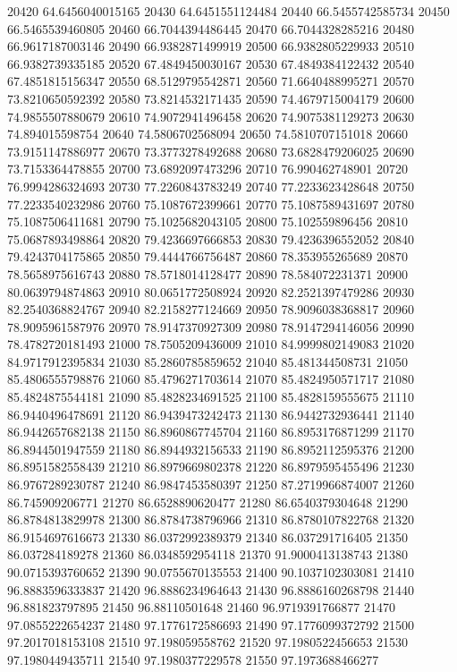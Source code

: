 {20420 64.6456040015165
20430 64.6451551124484
20440 66.5455742585734
20450 66.5465539460805
20460 66.7044394486445
20470 66.7044328285216
20480 66.9617187003146
20490 66.9382871499919
20500 66.9382805229933
20510 66.9382739335185
20520 67.4849450030167
20530 67.4849384122432
20540 67.4851815156347
20550 68.5129795542871
20560 71.6640488995271
20570 73.8210650592392
20580 73.8214532171435
20590 74.4679715004179
20600 74.9855507880679
20610 74.9072941496458
20620 74.9075381129273
20630 74.894015598754
20640 74.5806702568094
20650 74.5810707151018
20660 73.9151147886977
20670 73.3773278492688
20680 73.6828479206025
20690 73.7153364478855
20700 73.6892097473296
20710 76.990462748901
20720 76.9994286324693
20730 77.2260843783249
20740 77.2233623428648
20750 77.2233540232986
20760 75.1087672399661
20770 75.1087589431697
20780 75.1087506411681
20790 75.1025682043105
20800 75.102559896456
20810 75.0687893498864
20820 79.4236697666853
20830 79.4236396552052
20840 79.4243704175865
20850 79.4444766756487
20860 78.353955265689
20870 78.5658975616743
20880 78.5718014128477
20890 78.584072231371
20900 80.0639794874863
20910 80.0651772508924
20920 82.2521397479286
20930 82.2540368824767
20940 82.2158277124669
20950 78.9096038368817
20960 78.9095961587976
20970 78.9147370927309
20980 78.9147294146056
20990 78.4782720181493
21000 78.7505209436009
21010 84.9999802149083
21020 84.9717912395834
21030 85.2860785859652
21040 85.481344508731
21050 85.4806555798876
21060 85.4796271703614
21070 85.4824950571717
21080 85.4824875544181
21090 85.4828234691525
21100 85.4828159555675
21110 86.9440496478691
21120 86.9439473242473
21130 86.9442732936441
21140 86.9442657682138
21150 86.8960867745704
21160 86.8953176871299
21170 86.8944501947559
21180 86.8944932156533
21190 86.8952112595376
21200 86.8951582558439
21210 86.8979669802378
21220 86.8979595455496
21230 86.9767289230787
21240 86.9847453580397
21250 87.2719966874007
21260 86.745909206771
21270 86.6528890620477
21280 86.6540379304648
21290 86.8784813829978
21300 86.8784738796966
21310 86.8780107822768
21320 86.9154697616673
21330 86.0372992389379
21340 86.037291716405
21350 86.037284189278
21360 86.0348592954118
21370 91.9000413138743
21380 90.0715393760652
21390 90.0755670135553
21400 90.1037102303081
21410 96.8883596333837
21420 96.8886234964643
21430 96.8886160268798
21440 96.881823797895
21450 96.88110501648
21460 96.9719391766877
21470 97.0855222654237
21480 97.1776172586693
21490 97.1776099372792
21500 97.2017018153108
21510 97.198059558762
21520 97.1980522456653
21530 97.1980449435711
21540 97.1980377229578
21550 97.1973688466277
}
